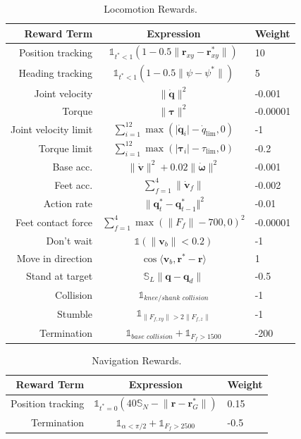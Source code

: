 \documentclass[conference]{IEEEtran}
\begin{document}
\begin{table}[H]
\centering
\caption{Locomotion Rewards.}
\label{tab:reward}
\begin{tabular}{rcl}
\hline
\textbf{Reward Term}      & \textbf{Expression}  & \textbf{Weight}     \\ \hline
Position tracking &$ \mathds{1}_{t^*<1}(1 - 0.5\lVert\mathbf{r}_{xy}-\mathbf{r}_{xy}^*\rVert)$  & 10\\ 
Heading tracking & $ \mathds{1}_{t^*<1}(1 - 0.5\lVert\psi-\psi^*\rVert)$  & 5\\ 
Joint velocity & $\lVert \dot{\mathbf{q}} \rVert ^2$ & -0.001 \\ 
Torque & $\lVert \boldsymbol{\tau}\rVert^2$ & -0.00001\\ 
Joint velocity limit & $\sum_{i=1}^{12} \max (\lvert\dot{\mathbf{q}}_{i}\rvert-\dot{q}_{\lim},0)$ & -1  \\ 
Torque limit & $ \sum_{i=1}^{12} \max (\lvert\boldsymbol{\tau}_{i}\rvert-\tau_{\lim},0)$ & -0.2 \\ 
Base acc. &$\lVert \dot{\mathbf{v}} \rVert ^2 + 0.02\lVert \dot{\boldsymbol{\omega}} \rVert ^2$ & -0.001 \\ 
Feet acc.   &$ \sum_{f=1}^4 \lVert \dot{\mathbf{v}}_{f}\rVert$ & -0.002 \\ 
Action rate   &$\lVert \mathbf{q}^*_t-\mathbf{q}^*_{t-1} \Vert ^2$ & -0.01 \\ 
Feet contact force  & $\sum_{f=1}^4 \max(\lVert F_{f} \rVert - 700, 0)^2$ & -0.00001 \\ 
Don't wait & $ \mathds{1}(\lVert \mathbf{v}_b \rVert < 0.2)$ & -1 \\ 
Move in direction & $ \cos \langle \mathbf{v}_b, \mathbf{r}^*-\mathbf{r} \rangle$  & 1\\ 
Stand at target & $\mathds{S}_L \lVert \mathbf{q} - \mathbf{q}_d\rVert$ & -0.5\\ 
Collision & $\mathds{1}_{\textit{knee/shank collision}}$ & -1 \\ 
Stumble & $\mathds{1}_{\lVert F_{f,xy}\rVert > 2\lVert F_{f,z}\rVert} $ & -1 \\
Termination & $\mathds{1}_{\textit{base collision}} + \mathds{1}_{F_f>1500}$ & -200\\
\hline
\end{tabular}
\end{table}

\begin{table}[H]
\centering
\caption{Navigation Rewards.}
\label{tab:reward_hl}
\begin{tabular}{rcl}
\hline
\textbf{Reward Term}      & \textbf{Expression}  & \textbf{Weight}     \\ \hline
Position tracking &$ \mathds{1}_{t^*=0}(40\mathds{S}_N - \lVert \mathbf{r} - \mathbf{r}_G^*\rVert) $  & 0.15\\ 
Termination & $\mathds{1}_{\alpha<\pi/2} + \mathds{1}_{F_f>2500}$ & -0.5\\ 
\hline
\end{tabular}
\end{table}
\end{document}
